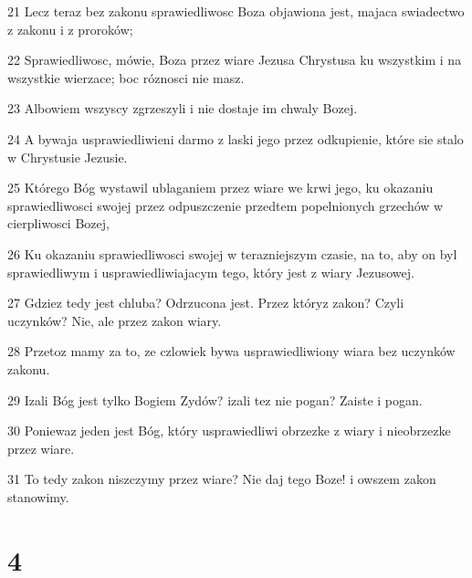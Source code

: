 \par 21 Lecz teraz bez zakonu sprawiedliwosc Boza objawiona jest, majaca swiadectwo z zakonu i z proroków;
\par 22 Sprawiedliwosc, mówie, Boza przez wiare Jezusa Chrystusa ku wszystkim i na wszystkie wierzace; boc róznosci nie masz.
\par 23 Albowiem wszyscy zgrzeszyli i nie dostaje im chwaly Bozej.
\par 24 A bywaja usprawiedliwieni darmo z laski jego przez odkupienie, które sie stalo w Chrystusie Jezusie.
\par 25 Którego Bóg wystawil ublaganiem przez wiare we krwi jego, ku okazaniu sprawiedliwosci swojej przez odpuszczenie przedtem popelnionych grzechów w cierpliwosci Bozej,
\par 26 Ku okazaniu sprawiedliwosci swojej w terazniejszym czasie, na to, aby on byl sprawiedliwym i usprawiedliwiajacym tego, który jest z wiary Jezusowej.
\par 27 Gdziez tedy jest chluba? Odrzucona jest. Przez któryz zakon? Czyli uczynków? Nie, ale przez zakon wiary.
\par 28 Przetoz mamy za to, ze czlowiek bywa usprawiedliwiony wiara bez uczynków zakonu.
\par 29 Izali Bóg jest tylko Bogiem Zydów? izali tez nie pogan? Zaiste i pogan.
\par 30 Poniewaz jeden jest Bóg, który usprawiedliwi obrzezke z wiary i nieobrzezke przez wiare.
\par 31 To tedy zakon niszczymy przez wiare? Nie daj tego Boze! i owszem zakon stanowimy.

\chapter{4}

